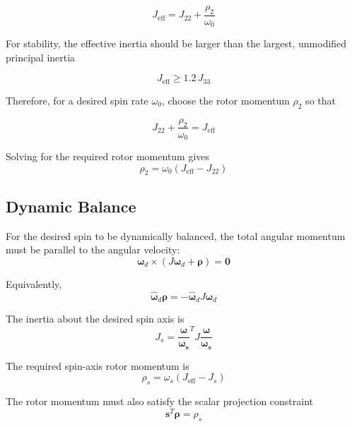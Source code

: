 \documentclass[conference,onecolumn,draftclsnofoot]{IEEEtran}
\begin{document}
\begin{equation}
J_{\mathrm{eff}}
=
J_{22}
+
\frac{\rho_2}{\omega_0}
\end{equation}

For stability, the effective inertia should be larger than the largest, unmodified principal inertia

\begin{equation}
J_{\mathrm{eff}}
\ge
1.2\,J_{33}
\end{equation}

Therefore, for a desired spin rate $\omega_0$, choose the rotor momentum
$\rho_2$ so that

\begin{equation}
J_{22}
+
\frac{\rho_2}{\omega_0}
=
J_{\mathrm{eff}}
\end{equation}

Solving for the required rotor momentum gives
\begin{equation}
\rho_2
=
\omega_0
\left(
J_{\mathrm{eff}}-J_{22}
\right)
\end{equation}

\subsection{Dynamic Balance}

For the desired spin to be dynamically balanced, the total angular momentum must
be parallel to the angular velocity:
\begin{equation}
\boldsymbol{\omega}_d
\times
\left(
J\boldsymbol{\omega}_d
+
\boldsymbol{\rho}
\right)
=
\mathbf{0}
\end{equation}

Equivalently,
\begin{equation}
\boldsymbol{\hat{\omega}}_d \boldsymbol{\rho}
=
-
\boldsymbol{\hat{\omega}}_d J\boldsymbol{\omega}_d 
\end{equation}

The inertia about the desired spin axis is
\begin{equation}
J_s
=
\mathbf{\frac{\omega}{\omega_s}}^T J \mathbf{\frac{\omega}{\omega_s}}
\end{equation}

The required spin-axis rotor momentum is
\begin{equation}
\rho_s
=
\omega_s
\left(
J_{\mathrm{eff}}-J_s
\right)
\end{equation}

The rotor momentum must also satisfy the scalar projection constraint
\begin{equation}
\mathbf{s}^T\boldsymbol{\rho}
=
\rho_s
\end{equation}
\end{document}
